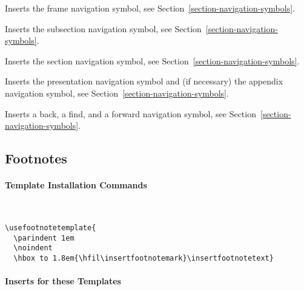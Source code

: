 \begin{command}{\insertframenavigationsymbol}
  Inserts the frame navigation symbol, see
  Section~\ref{section-navigation-symbols}.
\end{command}

\begin{command}{\insertsubsectionnavigationsymbol}
  Inserts the subsection navigation symbol, see
  Section~\ref{section-navigation-symbols}.
\end{command}

\begin{command}{\insertsectionnavigationsymbol}
  Inserts the section navigation symbol, see
  Section~\ref{section-navigation-symbols}.
\end{command}

\begin{command}{\insertdocnavigationsymbol}
  Inserts the presentation navigation symbol and (if necessary) the
  appendix navigation symbol, see
  Section~\ref{section-navigation-symbols}.
\end{command}

\begin{command}{\insertbackfindforwardnavigationsymbol}
  Inserts a back, a find, and a forward navigation symbol, see
  Section~\ref{section-navigation-symbols}.
\end{command}





\subsection{Footnotes}

\label{section-templates-footnotes}

\paragraph{Template Installation Commands}\

\begin{command}{\usefootnotetemplate{}}
  \example
\begin{verbatim}
\usefootnotetemplate{
  \parindent 1em
  \noindent
  \hbox to 1.8em{\hfil\insertfootnotemark}\insertfootnotetext}
\end{verbatim}
\end{command}


\paragraph{Inserts for these Templates}\

